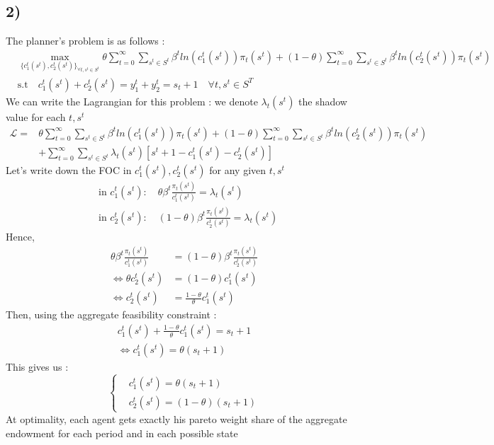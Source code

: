 \documentclass{article}
\begin{document}
\subsection{2)}
The planner's problem is as follows : 
$$\begin{aligned}
    &\max_{\{c_1^t(s^t),c_2^t(s^t)\}_{\forall t,s^t\in S^t}}\theta \sum_{t=0}^\infty\sum_{s^t\in S^t}\beta^tln(c_1^t(s^t))\pi_t(s^t)+(1-\theta)\sum_{t=0}^\infty\sum_{s^t\in S^t}\beta^tln(c_2^t(s^t))\pi_t(s^t)\\
    &\text{s.t} \quad c_1^t(s^t)+c_2^t(s^t)=y_1^t+y_2^t=s_t+1 \quad \forall t,s^t\in S^T
\end{aligned}$$
We can write the Lagrangian for this problem : we denote $\lambda_t(s^t)$ the shadow value for each $t,s^t$
$$\begin{aligned}\mathcal{L}= &\theta \sum_{t=0}^\infty\sum_{s^t\in S^t}\beta^tln(c_1^t(s^t))\pi_t(s^t)+(1-\theta)\sum_{t=0}^\infty\sum_{s^t\in S^t}\beta^tln(c_2^t(s^t))\pi_t(s^t)\\
&+\sum_{t=0}^\infty\sum_{s^t\in S^t}\lambda _t(s^t)[s^t+1-c_1^t(s^t)-c_2^t(s^t)]
\end{aligned} $$
Let's write down the FOC in $c_1^t(s^t), c_2^t(s^t)$ for any given $t,s^t$
$$\begin{aligned}
    &\text{in }c_1^t(s^t):\quad \theta \beta ^t\frac{\pi_t(s^t)}{c_1^t(s^t)}=\lambda_t(s^t)\\
    &\text{in }c_2^t(s^t):\quad (1-\theta) \beta ^t\frac{\pi_t(s^t)}{c_2^t(s^t)}=\lambda_t(s^t)
\end{aligned}$$
Hence, 
$$\begin{aligned}\theta \beta ^t\frac{\pi_t(s^t)}{c_1^t(s^t)} &= (1-\theta) \beta ^t\frac{\pi_t(s^t)}{c_2^t(s^t)}\\
\Leftrightarrow \theta c_2^t(s^t)&=(1-\theta)c_1^t(s^t)\\
\Leftrightarrow c_2^t(s^t)&=\frac{1-\theta}{\theta}c_1^t(s^t)
\end{aligned}$$
Then, using the aggregate feasibility constraint : 
$$\begin{aligned}
    c_1^t(s^t)+\frac{1-\theta}{\theta}c_1^t(s^t)=s_t+1\\
    \Leftrightarrow c_1^t(s^t)=\theta (s_t+1)
\end{aligned}$$
This gives us : 
$$\left\{\begin{aligned}
   &c_1^t(s^t)=\theta(s_t+1)\\
   &c_2^t(s^t)=(1-\theta)(s_t+1)
\end{aligned} \right.$$
At optimality, each agent gets exactly his pareto weight share of the aggregate endowment for each period and in each possible state 
\end{document}
